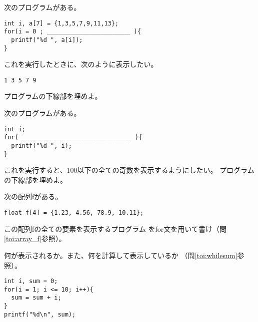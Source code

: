 \documentclass[12pt,a4j]{jarticle}
\newcounter{toi}
\def\toi{%
\bigskip\bigskip\noindent
\addtocounter{toi}{1}
\shadowbox{\bfseries\large 問\thetoi}
\nopagebreak[4]\bigskip\nopagebreak[4]
}
\begin{document}


\toi

次のプログラムがある。
\begin{verbatim}
int i, a[7] = {1,3,5,7,9,11,13};
for(i = 0 ; ＿＿＿＿＿＿＿＿＿＿＿＿＿＿ ){
  printf("%d ", a[i]);
}
\end{verbatim}
これを実行したときに、次のように表示したい。
\begin{verbatim}
1 3 5 7 9
\end{verbatim}
プログラムの下線部を埋めよ。





\toi

次のプログラムがある。
\begin{verbatim}
int i;
for(＿＿＿＿＿＿＿＿＿＿＿＿＿＿＿＿＿＿＿ ){
  printf("%d ", i);
}
\end{verbatim}
これを実行すると、100以下の全ての奇数を表示するようにしたい。
プログラムの下線部を埋めよ。




\toi

次の配列{\ttfamily f}がある。
\begin{verbatim}
float f[4] = {1.23, 4.56, 78.9, 10.11};
\end{verbatim}
この配列{\ttfamily f}の全ての要素を表示するプログラム
を{\ttfamily for}文を用いて書け（問\ref{toi:array_f}参照）。

\vspace*{3cm}





\toi


何が表示されるか。また、何を計算して表示しているか
（問\ref{toi:whilesum}参照）。

\begin{verbatim}
int i, sum = 0;
for(i = 1; i <= 10; i++){
  sum = sum + i;
}
printf("%d\n", sum);
\end{verbatim}
\end{document}

